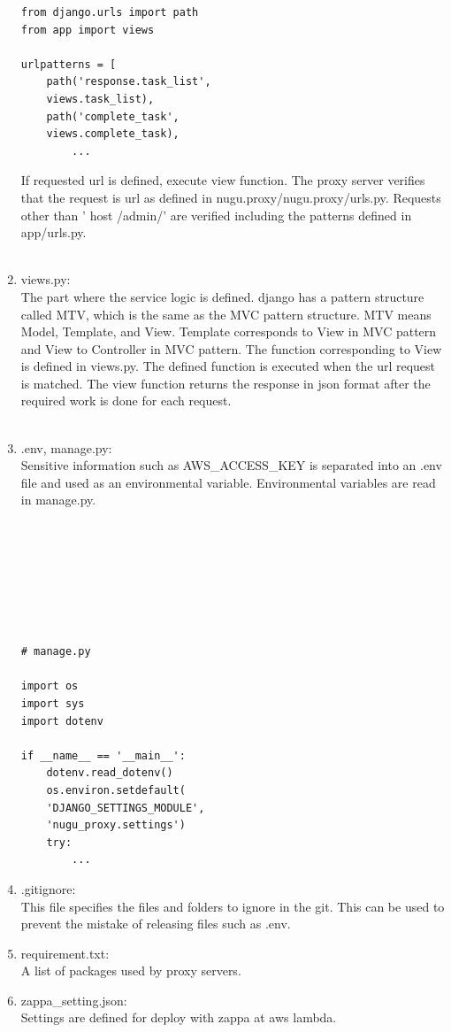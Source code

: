 \documentclass[conference]{IEEEtran}
\begin{document}
\begin{enumerate}
\begin{lstlisting}[frame=single]
from django.urls import path
from app import views

urlpatterns = [
    path('response.task_list', 
    views.task_list),
    path('complete_task', 
    views.complete_task),
		...
            \end{lstlisting}
            If requested url is defined, execute view function. The proxy server verifies that the request is url as defined in nugu.proxy/nugu.proxy/urls.py. Requests other than '{{ host }}/admin/' are verified including the patterns defined in app/urls.py. \\ \\
            
        \item views.py: \\
        The part where the service logic is defined. django has a pattern structure called MTV, which is the same as the MVC pattern structure. MTV means Model, Template, and View. Template corresponds to View in MVC pattern and View to Controller in MVC pattern. The function corresponding to View is defined in views.py. The defined function is executed when the url request is matched. The view function returns the response in json format after the required work is done for each request. \\ \\
        
        \item .env, manage.py: \\
        Sensitive information such as AWS\_ACCESS\_KEY is separated into an .env file and used as an environmental variable. Environmental variables are read in manage.py. \\ \\ \\ \\ \\ \\ \\ \\
            \begin{lstlisting}[frame=single]
# manage.py

import os
import sys
import dotenv

if __name__ == '__main__':
    dotenv.read_dotenv()
    os.environ.setdefault(
    'DJANGO_SETTINGS_MODULE', 
    'nugu_proxy.settings')
    try:
        ...
            \end{lstlisting}
        
        \item .gitignore: \\
        This file specifies the files and folders to ignore in the git. This can be used to prevent the mistake of releasing files such as .env. \\
        \item requirement.txt: \\
        A list of packages used by proxy servers. \\
        \item zappa\_setting.json: \\
        Settings are defined for deploy with zappa at aws lambda. \\
            

\end{enumerate}
\end{document}
